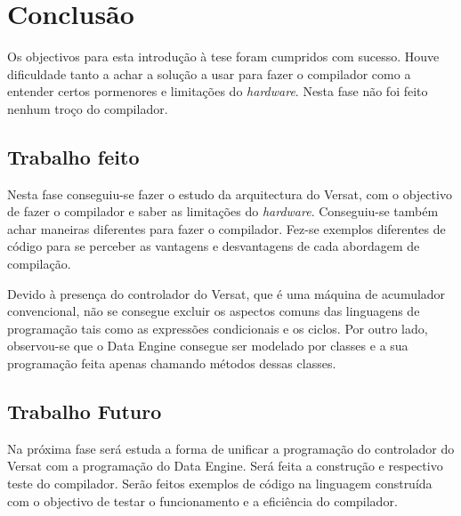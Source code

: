 
\chapter{Conclusão}
\label{chapter:conclusao}

Os objectivos para esta introdução à tese foram cumpridos com
sucesso. Houve dificuldade tanto a achar a solução a usar para fazer o
compilador como a entender certos pormenores e limitações do {\it
  hardware}. Nesta fase não foi feito nenhum troço do compilador.


\section{Trabalho feito}
\label{section:achievements}

Nesta fase conseguiu-se fazer o estudo da arquitectura do Versat, com
o objectivo de fazer o compilador e saber as limitações do {\it
  hardware}.  Conseguiu-se também achar maneiras diferentes para fazer o
compilador. Fez-se exemplos diferentes de código para se perceber as
vantagens e desvantagens de cada abordagem de compilação.

Devido à presença do controlador do Versat, que é uma máquina de
acumulador convencional, não se consegue excluir os aspectos comuns
das linguagens de programação tais como as expressões condicionais e
os ciclos. Por outro lado, observou-se que o Data Engine consegue ser
modelado por classes e a sua programação feita apenas chamando métodos
dessas classes.


\section{Trabalho Futuro}
\label{section:futuro}

Na próxima fase será estuda a forma de unificar a programação do
controlador do Versat com a programação do Data Engine. Será feita a
construção e respectivo teste do compilador. Serão feitos exemplos de
código na linguagem construída com o objectivo de testar o
funcionamento e a eficiência do compilador.


\cleardoublepage

